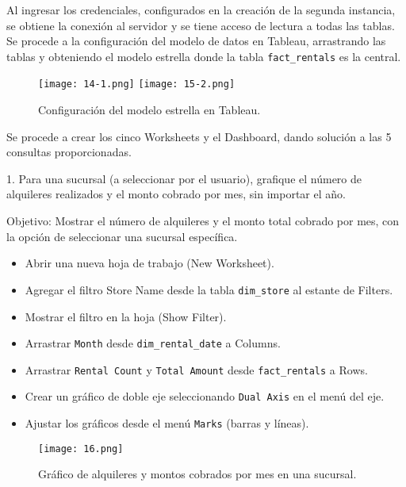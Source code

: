 \documentclass{article}
\begin{document}
\newpage
Al ingresar los credenciales, configurados en la creación de la segunda instancia, se obtiene la conexión al servidor y se tiene acceso de lectura a todas las tablas. Se procede a la configuración del modelo de datos en Tableau, arrastrando las tablas y obteniendo el modelo estrella donde la tabla \texttt{fact\_rentals} es la central.

\begin{figure}[h]
    \centering
    \texttt{[image: 14-1.png]} %
    \texttt{[image: 15-2.png]} %
    \caption{Configuración del modelo estrella en Tableau.}
    \label{fig:modelo-estrella}
\end{figure}

\newpage
Se procede a crear los cinco Worksheets y el Dashboard, dando solución a las 5 consultas proporcionadas.

1. Para una sucursal (a seleccionar por el usuario), grafique el número de alquileres realizados y el monto cobrado por mes, sin importar el año.

Objetivo: Mostrar el número de alquileres y el monto total cobrado por mes, con la opción de seleccionar una sucursal específica.

\begin{itemize}
    \item Abrir una nueva hoja de trabajo (New Worksheet).
    \item Agregar el filtro Store Name desde la tabla \texttt{dim\_store} al estante de Filters.
    \item Mostrar el filtro en la hoja (Show Filter).
    \item Arrastrar \texttt{Month} desde \texttt{dim\_rental\_date} a Columns.
    \item Arrastrar \texttt{Rental Count} y \texttt{Total Amount} desde \texttt{fact\_rentals} a Rows.
    \item Crear un gráfico de doble eje seleccionando \texttt{Dual Axis} en el menú del eje.
    \item Ajustar los gráficos desde el menú \texttt{Marks} (barras y líneas).
\end{itemize}

\begin{figure}[h]
    \centering
    \texttt{[image: 16.png]} %
    \caption{Gráfico de alquileres y montos cobrados por mes en una sucursal.}
    \label{fig:alquileres-sucursal}
\end{figure}
\end{document}
